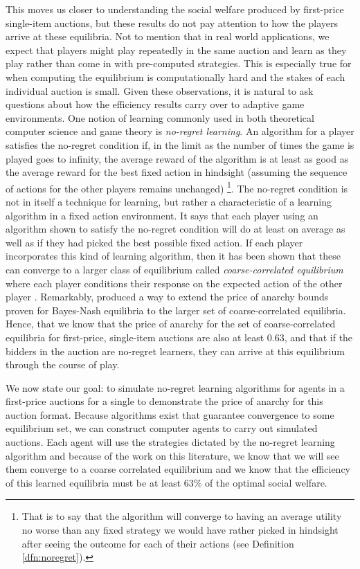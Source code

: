 \documentclass[12pt,twoside]{reedthesis}
\begin{document}
This moves us closer to understanding the social welfare produced by first-price single-item auctions, but these results do not pay attention to how the players arrive at these equilibria. Not to mention that in real world applications, we expect that players might play repeatedly in the same auction and learn as they play rather than come in with pre-computed strategies. This is especially true for when computing the equilibrium is computationally hard and the stakes of each individual auction is small. Given these observations, it is natural to ask questions about how the efficiency results carry over to adaptive game environments. One notion of learning  commonly used in both theoretical computer science and game theory is {\em no-regret learning}. An algorithm for a player satisfies the no-regret condition if, in the limit as the number of times the game is played goes to infinity, the average reward of the algorithm is at least as good as the average reward for the best fixed action in hindsight (assuming the sequence of actions for the other players remains unchanged) \footnote{That is to say that the algorithm will converge to having an average utility no worse than any fixed strategy we would have rather picked in hindsight after seeing the outcome for each of their actions (see Definition \ref{dfn:noregret}).}. The no-regret condition is not in itself a technique for learning, but rather a characteristic of a learning algorithm in a fixed action environment. It says that each player using an algorithm shown to satisfy the no-regret condition will do at least on average as well as if they had picked the best possible fixed action. If each player  incorporates this kind of learning algorithm, then it has been shown that these can converge to a larger class of equilibrium called {\em coarse-correlated equilibrium} where each player conditions their response on the expected action of the other player \citep{Blum2007}. Remarkably, \cite{Roughgarden2017}  produced a way to extend the price of anarchy bounds proven for Bayes-Nash equilibria to the larger set of coarse-correlated equilibria. Hence, that we know that the price of anarchy for the set of coarse-correlated equilibria for first-price, single-item auctions are also at least 0.63, and that if the bidders in the auction are no-regret learners, they can arrive at this equilibrium through the course of play.

We now state our goal: to simulate no-regret learning algorithms for agents in a first-price auctions for a single to demonstrate the price of anarchy for this auction format. Because algorithms exist that guarantee convergence to some equilibrium set, we can construct computer agents to carry out simulated auctions. Each agent will use the strategies dictated by the no-regret learning algorithm and because of the work on this literature, we know that we will see them converge to a coarse correlated equilibrium and we know that the efficiency of this learned equilibria must be at least 63\% of the optimal social welfare.
\end{document}
